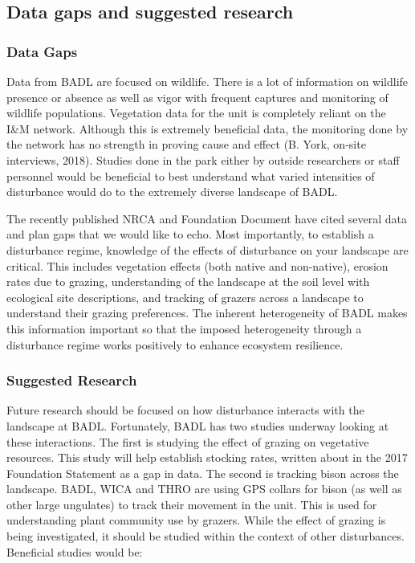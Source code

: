\subsection{Data gaps and suggested research}

\subsubsection{Data Gaps}

Data from BADL are focused on wildlife. 
There is a lot of information on wildlife presence or absence as well as vigor with frequent captures and monitoring of wildlife populations. 
Vegetation data for the unit is completely reliant on the I\&M network.
Although this is extremely beneficial data, the monitoring done by the network has no strength in proving cause and effect (B. York, on-site interviews, 2018). 
Studies done in the park either by outside researchers or staff personnel would be beneficial to best understand what varied intensities of disturbance would do to the extremely diverse landscape of BADL.

The recently published NRCA and Foundation Document have cited several data and plan gaps that we would like to echo. 
Most importantly, to establish a disturbance regime, knowledge of the effects of disturbance on your landscape are critical. 
This includes vegetation effects (both native and non-native), erosion rates due to grazing, understanding of the landscape at the soil level with ecological site descriptions, and tracking of grazers across a landscape to understand their grazing preferences. 
The inherent heterogeneity of BADL makes this information important so that the imposed heterogeneity through a disturbance regime works positively to enhance ecosystem resilience.

\subsubsection{Suggested Research}

Future research should be focused on how disturbance interacts with the landscape at BADL. 
Fortunately, BADL has two studies underway looking at these interactions. 
The first is studying the effect of grazing on vegetative resources. 
This study will help establish stocking rates, written about in the 2017 Foundation Statement as a gap in data. 
The second is tracking bison across the landscape. 
BADL, WICA and THRO are using GPS collars for bison (as well as other large ungulates) to track their movement in the unit. 
This is used for understanding plant community use by grazers. 
While the effect of grazing is being investigated, it should be studied within the context of other disturbances. 
Beneficial studies would be:

